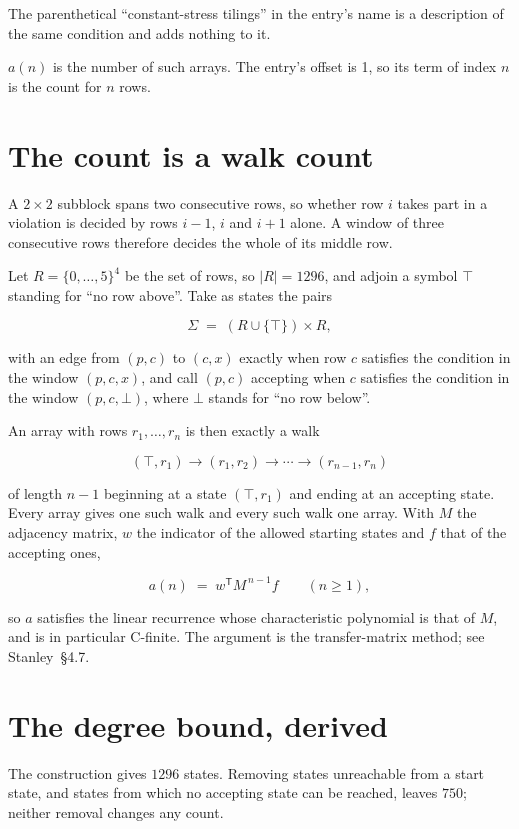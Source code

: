 \documentclass[11pt]{article}
\theoremstyle{definition}
\begin{document}
The parenthetical ``constant-stress tilings'' in the entry's name is a description of the same condition and adds nothing to it.

$a(n)$ is the number of such arrays. The entry's offset is 1, so its term of index $n$ is the count for $n$ rows.

\section{The count is a walk count}

A $2 \times 2$ subblock spans two consecutive rows, so whether row $i$ takes part in a violation is decided by rows $i-1$, $i$ and $i+1$ alone. A window of three consecutive rows therefore decides the whole of its middle row.

Let $R = \{0,\dots,5\}^{4}$ be the set of rows, so $|R| = 1296$, and adjoin a symbol $\top$ standing for ``no row above''. Take as states the pairs

\[\Sigma \;=\; (R \cup \{\top\}) \times R,\]

with an edge from $(p,c)$ to $(c,x)$ exactly when row $c$ satisfies the condition in the window $(p,c,x)$, and call $(p,c)$ accepting when $c$ satisfies the condition in the window $(p,c,\bot)$, where $\bot$ stands for ``no row below''.

An array with rows $r_1,\dots,r_n$ is then exactly a walk

\[(\top,r_1) \to (r_1,r_2) \to \cdots \to (r_{n-1},r_n)\]

of length $n-1$ beginning at a state $(\top,r_1)$ and ending at an accepting state. Every array gives one such walk and every such walk one array. With $M$ the adjacency matrix, $w$ the indicator of the allowed starting states and $f$ that of the accepting ones,

\[a(n) \;=\; w^{\mathsf T} M^{\,n-1} f \qquad (n \ge 1),\]

so $a$ satisfies the linear recurrence whose characteristic polynomial is that of $M$, and is in particular C-finite. The argument is the transfer-matrix method; see Stanley~\S4.7.

\section{The degree bound, derived}

The construction gives $1296$ states. Removing states unreachable from a start state, and states from which no accepting state can be reached, leaves $750$; neither removal changes any count.
\end{document}
